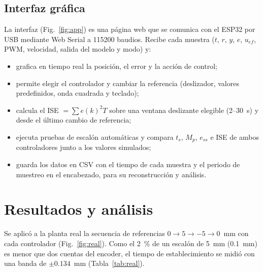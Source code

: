 \documentclass[conference]{IEEEtran}
\begin{document}
\subsection{Interfaz gráfica}
La interfaz (Fig.~\ref{fig:app}) es una página web que se comunica con el
ESP32 por USB mediante Web Serial a 115200 baudios. Recibe cada muestra
($t$, $r$, $y$, $e$, $u_{ef}$, PWM, velocidad, salida del modelo y modo) y:
\begin{itemize}
  \item grafica en tiempo real la posición, el error y la acción de control;
  \item permite elegir el controlador y cambiar la referencia (deslizador,
        valores predefinidos, onda cuadrada y teclado);
  \item calcula el ISE $=\sum e(k)^2T$ sobre una ventana deslizante elegible
        (2--30~s) y desde el último cambio de referencia;
  \item ejecuta pruebas de escalón automáticas y compara $t_s$, $M_p$,
        $e_{ss}$ e ISE de ambos controladores junto a los valores simulados;
  \item guarda los datos en CSV con el tiempo de cada muestra y el periodo de
        muestreo en el encabezado, para su reconstrucción y análisis.
\end{itemize}

\section{Resultados y análisis}

Se aplicó a la planta real la secuencia de referencias
$0 \to 5 \to -5 \to 0$~mm con cada controlador (Fig.~\ref{fig:real}). Como el
2~\% de un escalón de 5~mm (0.1~mm) es menor que dos cuentas del encoder, el
tiempo de establecimiento se midió con una banda de $\pm0.134$~mm
(Tabla~\ref{tab:real}).
\end{document}
